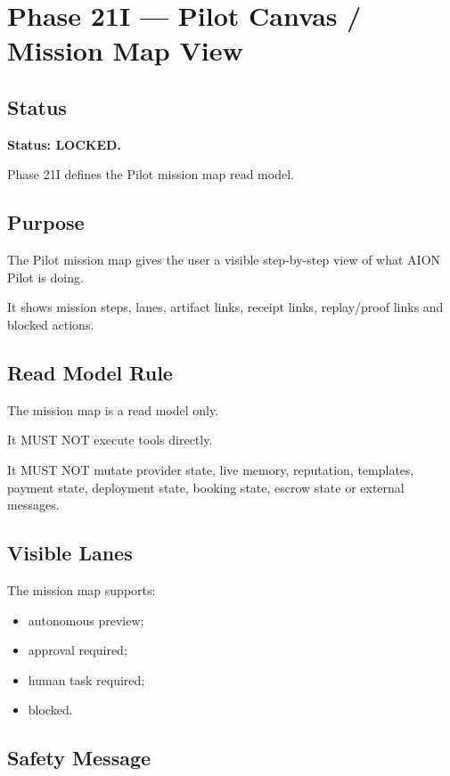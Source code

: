 \section{Phase 21I --- Pilot Canvas / Mission Map View}
\label{sec:aion-phase21i-pilot-mission-map-view}

\subsection{Status}

\textbf{Status: LOCKED.}

Phase 21I defines the Pilot mission map read model.

\subsection{Purpose}

The Pilot mission map gives the user a visible step-by-step view of what AION Pilot is doing.

It shows mission steps, lanes, artifact links, receipt links, replay/proof links and blocked actions.

\subsection{Read Model Rule}

The mission map is a read model only.

It MUST NOT execute tools directly.

It MUST NOT mutate provider state, live memory, reputation, templates, payment state, deployment state, booking state, escrow state or external messages.

\subsection{Visible Lanes}

The mission map supports:

\begin{itemize}
  \item autonomous preview;
  \item approval required;
  \item human task required;
  \item blocked.
\end{itemize}

\subsection{Safety Message}

